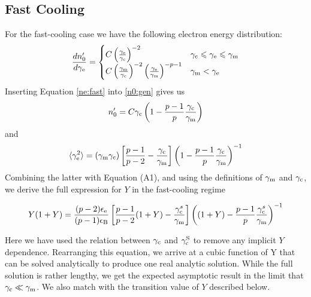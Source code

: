 \documentclass[fleqn,usenatbib]{mnras}
\begin{document}
\subsection{Fast Cooling}

For the fast-cooling case we have the following electron energy distribution:
\begin{equation}
\label{ne:fast}
\frac{dn_0^{\prime}}{d\gamma_{\rm e}}= 
\begin{cases} 
C \left(\frac{\gamma_{\rm e}}{\gamma_{\rm c}}\right)^{-2} & \gamma_{\rm c} \leq \gamma_{\rm e}\leq\gamma_{\rm m} \\
C\left(\frac{\gamma_{\rm m}}{\gamma_{\rm c}}\right)^{-2}\left(\frac{\gamma_{\rm e}}{\gamma_{\rm m}}\right)^{-p-1} & \gamma_{\rm m} < \gamma_{\rm e}\\ 
\end{cases}
\end{equation}
Inserting Equation \ref{ne:fast} into \ref{n0:gen} gives us
\begin{equation}
\label{n0:fast}
n_0^{\prime} = C\gamma_{\rm c} \left(1-\frac{p-1}{p}\frac{\gamma_{\rm c}}{\gamma_{\rm m}}\right)
\end{equation}
and
\begin{equation}
\langle \gamma_{\rm e}^2 \rangle = (\gamma_{\rm m}\gamma_{\rm c})\left[\frac{p-1}{p-2}-\frac{\gamma_{\rm c}}{\gamma_{\rm m}}\right]\left(1-\frac{p-1}{p}\frac{\gamma_{\rm c}}{\gamma_{\rm m}}\right)^{-1}
\end{equation}
Combining the latter with Equation (A1), and using the definitions of $\gamma_{\rm m}$ and $ \gamma_{\rm c}$, we derive the full expression for $Y$ in the fast-cooling regime


\begin{equation}
\label{Yt:fast}
Y(1+Y) = \frac{(p-2)\epsilon_{\rm e}}{(p-1)\epsilon_{\rm B}}\left[\frac{p-1}{p-2}(1+Y)-\frac{\gamma_{\rm c}^s}{\gamma_{\rm m}}\right]\left((1+Y)-\frac{p-1}{p}\frac{\gamma_{\rm c}^s}{\gamma_{\rm m}}\right)^{-1}
\end{equation}


Here we have used the relation between $\gamma_{\rm c}$ and $\gamma_{\rm c}^{\rm S}$ to remove any implicit $Y$ dependence.  Rearranging this equation, we arrive at a cubic function of Y that can be solved analytically to produce one real analytic solution. While the full solution is rather lengthy, we get the expected asymptotic result in the limit that $\gamma_{\rm c}\ll\gamma_{\rm m}$. We also match with the transition value of $Y$ described below.
\end{document}
